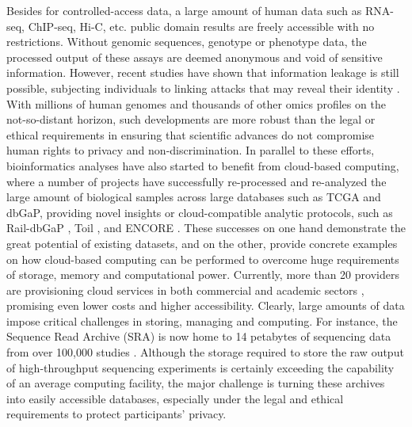 \documentclass[letter]{bioinfo}
\begin{document}
	Besides for controlled-access data, a large amount of human data such as RNA-seq, ChIP-seq, Hi-C, etc. public domain results are freely accessible with no restrictions. Without genomic sequences, genotype or phenotype data, the processed output of these assays are deemed anonymous and void of sensitive information. However, recent studies have shown that information leakage is still possible, subjecting individuals to linking attacks that may reveal their identity \citep{Harmanci:2016:Quantification, Harmanci:2018:Analysis}.  With millions of human genomes and thousands of other omics profiles on the not-so-distant horizon, such developments are more robust than the legal or ethical requirements in ensuring that scientific advances do not compromise human rights to privacy and non-discrimination.  In parallel to these efforts, bioinformatics analyses have also started to benefit from cloud-based computing, where a number of projects have successfully re-processed and re-analyzed the large amount of biological samples across large databases such as TCGA and dbGaP, providing novel insights or cloud-compatible analytic protocols, such as Rail-dbGaP \citep{Nellore:2016:RaildbGaP}, Toil \citep{Vivian:2017:Toil}, and ENCORE \citep{UMich:2018:Encore}. These successes on one hand demonstrate the great potential of existing datasets, and on the other, provide concrete examples on how cloud-based computing can be performed to overcome huge requirements of storage, memory and computational power. Currently, more than 20 providers are provisioning cloud services in both commercial and academic sectors \citep{Langmead:2018:Cloud}, promising even lower costs and higher accessibility.  Clearly, large amounts of data impose critical challenges in storing, managing and computing. For instance, the Sequence Read Archive (SRA) \citep{Leinonen:2011:Sequence} is now home to 14 petabytes of sequencing data from over 100,000 studies \citep{Langmead:2018:Cloud}. Although the storage required to store the raw output of high-throughput sequencing experiments is certainly exceeding the capability of an average computing facility, the major challenge is turning these archives into easily accessible databases, especially under the legal and ethical requirements to protect participants' privacy.
	
\end{document}
